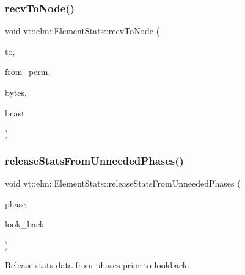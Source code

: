 \subsubsection{\texorpdfstring{recv\+To\+Node()}{recvToNode()}}
{\footnotesize\ttfamily void vt\+::elm\+::\+Element\+Stats\+::recv\+To\+Node (\begin{DoxyParamCaption}\item[{\hyperlink{namespacevt_a866da9d0efc19c0a1ce79e9e492f47e2}{Node\+Type}}]{to,  }\item[{\hyperlink{structvt_1_1elm_1_1_element_i_d_struct}{Element\+I\+D\+Struct}}]{from\+\_\+perm,  }\item[{double}]{bytes,  }\item[{bool}]{bcast }\end{DoxyParamCaption})}

\mbox{\label{structvt_1_1elm_1_1_element_stats_ab6abdce753149b261fd238392cc927c8}} 
\subsubsection{\texorpdfstring{release\+Stats\+From\+Unneeded\+Phases()}{releaseStatsFromUnneededPhases()}}
{\footnotesize\ttfamily void vt\+::elm\+::\+Element\+Stats\+::release\+Stats\+From\+Unneeded\+Phases (\begin{DoxyParamCaption}\item[{\hyperlink{namespacevt_a46ce6733d5cdbd735d561b7b4029f6d7}{Phase\+Type}}]{phase,  }\item[{unsigned int}]{look\+\_\+back }\end{DoxyParamCaption})\hspace{0.3cm}{\ttfamily [protected]}}



Release stats data from phases prior to lookback. 

\mbox{\label{structvt_1_1elm_1_1_element_stats_af9cd414ce031379618bf7a7c6f1e5888}} 
